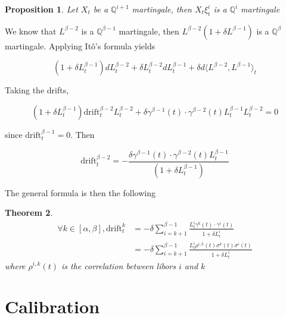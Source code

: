 \documentclass{article}
\newtheorem{theorem}{Theorem}[section]
\newtheorem{proposition}[theorem]{Proposition}
\begin{document}
\begin{proposition}
	Let $X_t$ be a $\mathbb{Q}^{i+1}$ martingale, then $X_t \xi_t^i$ is a $\mathbb{Q}^{i}$ martingale
\end{proposition}

\noindent We know that $L^{\beta-2}$ is a $\mathbb{Q}^{\beta-1}$ martingale, then $L^{\beta-2} \left(1 + \delta L^{\beta-1}\right)$ is a $\mathbb{Q}^{\beta}$ martingale. Applying Itô's formula yields

\begin{equation*}
	\left(1 + \delta L^{\beta-1}_t\right) dL^{\beta-2} _t + \delta L^{\beta-2}_t dL^{\beta-1}_t + \delta d\langle L^{\beta-2}, L^{\beta-1}\rangle_t
\end{equation*}

\noindent Taking the drifts,

\begin{equation*}
	\left(1 + \delta L^{\beta-1}_t\right) \text{drift}^{\beta-2}_t L^{\beta-2}_t+ \delta \gamma^{\beta-1}(t)\cdot\gamma^{\beta-2}(t)  L^{\beta-1}_t L^{\beta-2}_t= 0
\end{equation*}

\noindent since $\text{drift}_t^{\beta-1} = 0$. Then

\begin{equation}
	\text{drift}^{\beta-2}_t = -\frac{\delta \gamma^{\beta-1}(t)\cdot\gamma^{\beta-2}(t)  L^{\beta-1}_t}{\left(1 + \delta L^{\beta-1}_t\right)}	
\end{equation}

The general formula is then the following

\begin{theorem}
	\begin{equation}
	\begin{aligned}
		\forall k \in [\alpha,\beta], \text{drift}_t^k &= -\delta \sum_{i=k+1}^{\beta-1} \frac{L_t^i \gamma^k(t) \cdot \gamma^i(t)}{1 + \delta L_t^i}\\
		&= -\delta \sum_{i=k+1}^{\beta-1} \frac{L_t^i \rho^{i,k}(t)\sigma^k(t) \sigma^i(t)}{1 + \delta L_t^i}
	\end{aligned}
	\end{equation}
	where $\rho^{i,k}(t)$ is the correlation between libors $i$ and $k$
\end{theorem}

\section{Calibration}
\end{document}
